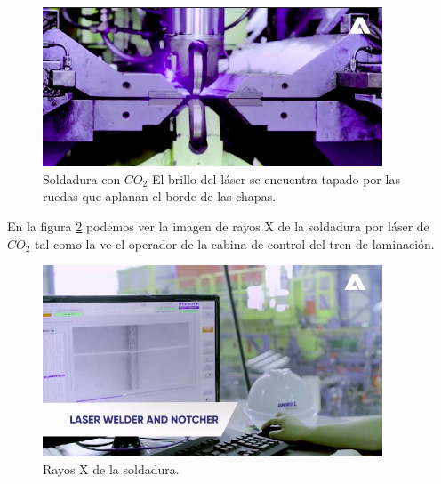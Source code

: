 \begin{figure}[h]
	\centering
	\includegraphics[width=0.90\textwidth]{./Figures/soldadorCO201.jpg}
	\caption{Soldadura con $CO_{2}$ El brillo del láser se encuentra tapado por las ruedas que aplanan el borde de las chapas\protect\footnotemark.}
	\label{fig:soldadora} 
\end{figure}

En la figura \ref{fig:rayosX} podemos ver la imagen de rayos X de la soldadura por láser de $CO_{2}$ tal como la ve el operador de la cabina de control del tren de laminación.

\begin{figure}[h]
	\centering
	\includegraphics[width=0.90\textwidth]{./Figures/soldaduraCO201.jpg}
	\caption{Rayos X de la soldadura\protect\footnotemark.}
	\label{fig:rayosX} 
\end{figure}


